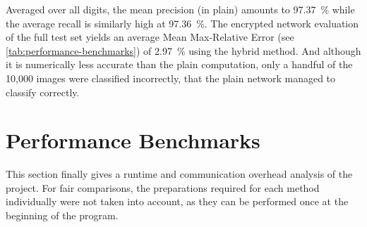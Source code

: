 Averaged over all digits, the mean precision (in plain) amounts to \SI{97.37}{\percent} while the average recall is similarly high at \SI{97.36}{\percent}.
The encrypted network evaluation of the full test set yields an average Mean Max-Relative Error (see \cref{tab:performance-benchmarks}) of \SI{2.97}{\percent} using the hybrid method.
And although it is numerically less accurate than the plain computation, only a handful of the 10,000 images were classified incorrectly, that the plain network managed to classify correctly.

\section{Performance Benchmarks}
\label{sec:performance-benchmarks}
This section finally gives a runtime and communication overhead analysis of the project.
For fair comparisons, the preparations required for each method individually were not taken into account, as they can be performed once at the beginning of the program.

